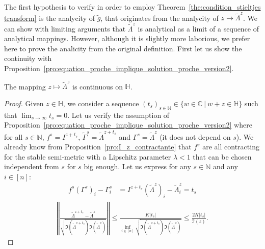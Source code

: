 \documentclass[a4papaer, titlepage]{book}
\begin{document}
The first hypothesis to verify in order to employ Theorem~\ref{the:condition_stieltjes transform} is the analycity of $\tilde g$, that originates from the analycity of $z \to \tilde \Lambda^z$. We can show with limiting arguments that $\tilde \Lambda^z$ is analytical as a limit of a sequence of analytical mappings. However, although it is slightly more laborious, we prefer here to prove the analicity from the original definition. First let us show the continuity with Proposition~\ref{pro:equation_proche_implique_solution_proche_version2}.
\begin{proposition}\label{pro:D_h_continuous}
  The mapping $z\mapsto \tilde \Lambda^z$ is continuous on $\mathbb H$.%
\end{proposition}
\begin{proof}
    Given $z \in \mathbb H$, we consider a sequence $(t_s)_{s \in \mathbb N} \in \{w \in \mathbb C \ | \ w +z \in \mathbb H\}$ such that $\lim_{s \to \infty} t_s = 0$. Let us verify the assumption of Proposition~\ref{pro:equation_proche_implique_solution_proche_version2} where for all $s\in \mathbb N$, $f^s =  I^{z+t_s}$, $\tilde \Gamma^s = \tilde \Lambda^{z+t_s}$ and $\Gamma^s = \tilde \Lambda^z$ (it does not depend on $s$). We already know from Proposition~\ref{pro:I_z_contractante} that $f^s$ are all contracting for the stable semi-metric with a Lipschitz parameter $\lambda<1$ that can be chosen independent from $s$ for $s$ big enough. 
    Let us express for any $s \in \mathbb N$ and any $i\in [n]$:
  \begin{align}\label{eq:identite_f^s_m_f_0}
    f^s(\Gamma^s)_i - \Gamma^s_i
    &= I^{z+t_s}(\tilde \Lambda^z)_i - \tilde \Lambda^z_i 
    = t_s %
  \end{align}
  \begin{align*}
     \left\Vert \frac{\tilde \Lambda^{z+t_s}-\tilde \Lambda^z}{\sqrt{\Im(\tilde \Lambda^{z+t_s})\Im(\tilde \Lambda^z)}}\right\Vert \leq  \frac{K|t_s|}{\inf_{i\in [n]} \sqrt{\Im(\tilde \Lambda^{z+t_s})\Im(\tilde \Lambda^z)}} \leq \frac{2K |t_s|}{\Im(z)}.

\end{align*}
\end{proof}
\end{document}

